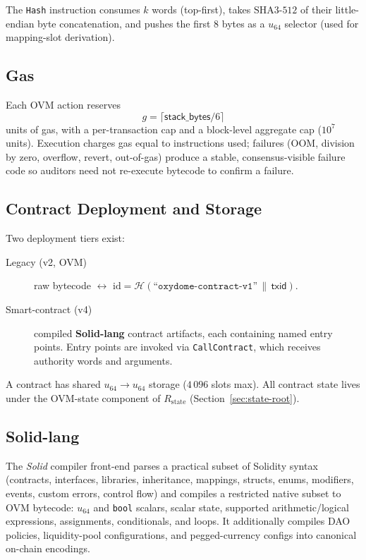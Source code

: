 \documentclass[11pt,a4paper]{article}
\theoremstyle{definition}
\newcommand{\ovm}{\textsf{OVM}}
\newcommand{\txid}{\textsf{txid}}
\newcommand{\DAO}{DAO}
\newcommand{\hash}{\mathcal{H}}
\begin{document}
The \texttt{Hash} instruction consumes $k$ words (top-first), takes
$\mathrm{SHA3\text{-}512}$ of their little-endian byte concatenation, and
pushes the first $8$ bytes as a $u_{64}$ selector (used for mapping-slot
derivation).

\subsection{Gas}

Each OVM action reserves
\[
g = \lceil \mathsf{stack\_bytes} / 6\rceil
\]
units of gas, with a per-transaction cap and a block-level aggregate cap
($10^{7}$ units).  Execution charges gas equal to instructions used; failures
(OOM, division by zero, overflow, revert, out-of-gas) produce a stable,
consensus-visible failure code so auditors need not re-execute bytecode to
confirm a failure.

\subsection{Contract Deployment and Storage}

Two deployment tiers exist:
\begin{description}
  \item[Legacy (v2, \ovm)] raw bytecode $\leftrightarrow$
    $\mathrm{id} = \hash(\texttt{``oxydome-contract-v1''}\,\|\,\txid)$.
  \item[Smart-contract (v4)] compiled \textbf{Solid-lang} contract artifacts,
    each containing named entry points.  Entry points are invoked via
    \texttt{CallContract}, which receives authority words and arguments.
\end{description}
A contract has shared $u_{64}\!\to\!u_{64}$ storage ($4\,096$ slots max).  All
contract state lives under the OVM-state component of $R_{\mathrm{state}}$
(Section~\ref{sec:state-root}).

\subsection{Solid-lang}

The \emph{Solid} compiler front-end parses a practical subset of Solidity
syntax (contracts, interfaces, libraries, inheritance, mappings, structs,
enums, modifiers, events, custom errors, control flow) and compiles a
restricted native subset to \ovm{} bytecode: $u_{64}$ and \texttt{bool} scalars,
scalar state, supported arithmetic/logical expressions, assignments,
conditionals, and loops.  It additionally compiles \DAO{} policies, liquidity-pool
configurations, and pegged-currency configs into canonical on-chain encodings.
\end{document}

